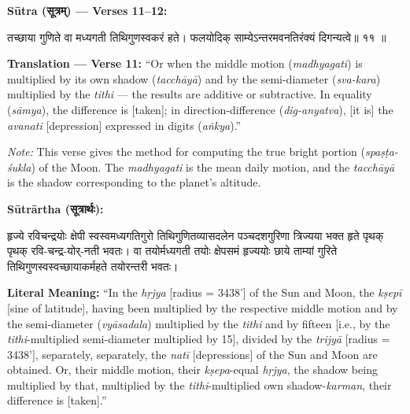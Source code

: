 \documentclass[11pt,a4paper]{article}
\newcommand{\dev}[1]{{\devanagarifont #1}}
\newenvironment{sanskritverse}{%
  \begin{center}\begin{minipage}{0.95\textwidth}
  \setlength{\leftskip}{1em}
  \setlength{\rightskip}{1em}
  \dev
}{\end{minipage}\end{center}}
\newenvironment{paracol}[1]{\begingroup}{\endgroup}
\newcommand{\switchcolumn}[1][]{%
  \ifnum#1=0\relax\else\par\nobreak\vspace{0.5em}\par\nobreak\fi%
}
\begin{document}
\vspace{0.5em}
\noindent\textbf{Sūtra ({\devanagarifont सूत्रम्}) — Verses 11--12:}

\begin{paracol}{2}

\begin{sanskritverse}
तच्छाया गुणिते वा मध्यगती तिथिगुणस्वकरं हते।
फलयोदिक् साम्येऽन्तरमवनतिरंक्यं दिगन्यत्वे॥ ११ ॥
\end{sanskritverse}

\switchcolumn

\textbf{Translation — Verse 11:} ``Or when the middle motion (\textit{madhyagati}) is multiplied by its own shadow (\textit{tacchāyā}) and by the semi-diameter (\textit{sva-kara}) multiplied by the \textit{tithi} --- the results are additive or subtractive. In equality (\textit{sāmya}), the difference is [taken]; in direction-difference (\textit{dig-anyatva}), [it is] the \textit{avanati} [depression] expressed in digits (\textit{aṅkya}).''

\textit{Note:} This verse gives the method for computing the true bright portion (\textit{spaṣṭa-śukla}) of the Moon. The \textit{madhyagati} is the mean daily motion, and the \textit{tacchāyā} is the shadow corresponding to the planet's altitude.

\end{paracol}

\vspace{0.5em}

\begin{paracol}{2}

\noindent\textbf{Sūtrārtha (\dev{सूत्रार्थः}):}
\begin{sanskritverse}
हृज्ये रविचन्द्रयोः क्षेपी स्वस्वमध्यगतिगुरो तिथिगुणितव्यासदलेन पञ्चदशगुरिणा
त्रिज्यया भक्त हृते पृथक् पृथक् रवि-चन्द्र-योर्-नती भवतः। वा तयोर्मध्यगती
तयोः क्षेपसमं हृज्ययोः छाये ताम्यां गुरिते तिथिगुणस्वस्वच्छायाकर्महते तयोरन्तरी भवतः।
\end{sanskritverse}

\switchcolumn

\textbf{Literal Meaning:} ``In the \textit{hṛjya} [radius = 3438'] of the Sun and Moon, the \textit{kṣepī} [sine of latitude], having been multiplied by the respective middle motion and by the semi-diameter (\textit{vyāsadala}) multiplied by the \textit{tithi} and by fifteen [i.e., by the \textit{tithi}-multiplied semi-diameter multiplied by 15], divided by the \textit{trijyā} [radius = 3438'], separately, separately, the \textit{natī} [depressions] of the Sun and Moon are obtained. Or, their middle motion, their \textit{kṣepa}-equal \textit{hṛjya}, the shadow being multiplied by that, multiplied by the \textit{tithi}-multiplied own shadow-\textit{karman}, their difference is [taken].''

\end{paracol}
\end{document}
